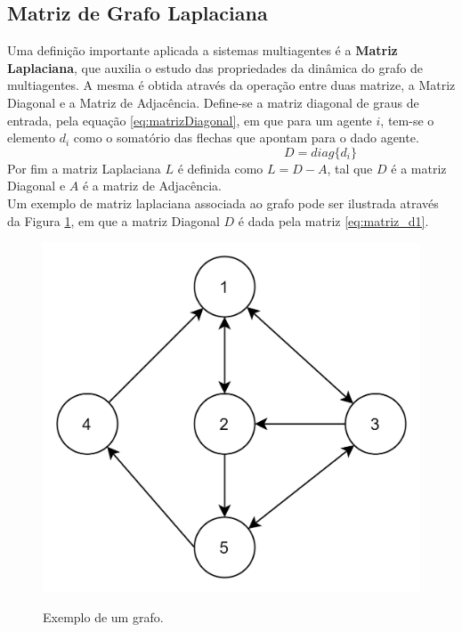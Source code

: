 \subsection{Matriz de Grafo Laplaciana}
Uma definição importante aplicada a sistemas multiagentes é a \textbf{Matriz Laplaciana}, que auxilia o estudo das propriedades da dinâmica do grafo de multiagentes. A mesma é obtida através da operação entre duas matrize, a Matriz Diagonal e a Matriz de Adjacência.
Define-se a matriz diagonal de graus de entrada, pela equação \ref{eq:matrizDiagonal}, em que para um agente $i$, tem-se o elemento $d_{i}$ como o somatório das flechas que apontam para o dado agente.
\begin{equation}\label{eq:matrizDiagonal}
\hspace{6cm} %
    D = diag\{d_{i}\}
\end{equation}
Por fim a matriz Laplaciana $L$ é definida como $L = D-A$, tal que $D$ é a matriz Diagonal e $A$ é a matriz de Adjacência.
\\
Um exemplo de matriz laplaciana associada ao grafo pode ser ilustrada através da Figura \ref{fig:exemplo_grafo}, em que a matriz Diagonal $D$ é dada pela matriz \ref{eq:matriz_d1}. 

\begin{figure}
    \centering
    \caption{Exemplo de um grafo.}
    \includegraphics[scale=0.2]{figures/Multiagente/ex_grafos1.png}
    \label{fig:exemplo_grafo}
\end{figure}

